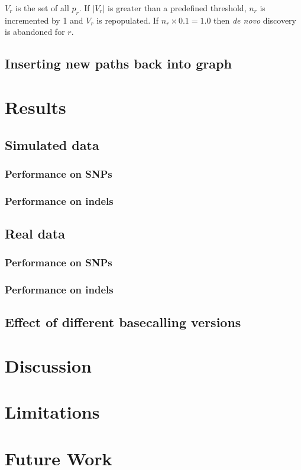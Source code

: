 $V_r$ is the set of all $p_r$. If $|V_r|$ is greater than a predefined threshold, $n_r$ is incremented by 1 and $V_r$ is repopulated. If $n_r \times 0.1 = 1.0$ then \textit{de novo} discovery is abandoned for $r$.

\subsection{Inserting new paths back into graph}

\section{Results}
\label{section1.3}

\subsection{Simulated data}

\subsubsection{Performance on SNPs}

\subsubsection{Performance on indels}

\subsection{Real data}

\subsubsection{Performance on SNPs}

\subsubsection{Performance on indels}

\subsection{Effect of different basecalling versions}

\section{Discussion}

\section{Limitations}

\section{Future Work}
